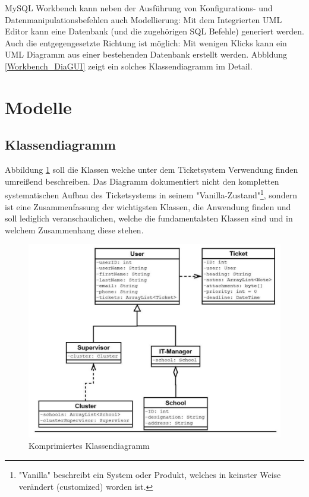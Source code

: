 	MySQL Workbench kann neben der Ausführung von Konfigurations- und Datenmanipulationsbefehlen auch Modellierung: Mit dem Integrierten UML Editor kann eine Datenbank (und die zugehörigen SQL Befehle) generiert werden. Auch die entgegengesetzte Richtung ist möglich: Mit wenigen Klicks kann ein UML Diagramm aus einer bestehenden Datenbank erstellt werden. Abbldung \ref{Workbench_DiaGUI} zeigt ein solches Klassendiagramm im Detail.
	
		
	\newpage
	\section{Modelle}
	\subsection{Klassendiagramm}
	Abbildung \ref{Klassendiagramm_System} soll die Klassen welche unter dem Ticketsystem Verwendung finden umreißend beschreiben. Das Diagramm dokumentiert nicht den kompletten systematischen Aufbau des Ticketsystems in seinem "Vanilla-Zustand"\footnote{"Vanilla" beschreibt ein System oder Produkt, welches in keinster Weise verändert (customized) worden ist.}, sondern ist eine Zusammenfassung der wichtigsten Klassen, die Anwendung finden und soll lediglich veranschaulichen, welche die fundamentalsten Klassen sind und in welchem Zusammenhang diese stehen.
	\begin{figure}[h]
		\centering
		\includegraphics[scale=0.9]{figures/Klassendiagramm.jpg}
		\caption{Komprimiertes Klassendiagramm}
		\label{Klassendiagramm_System}
	\end{figure}
	\newpage
